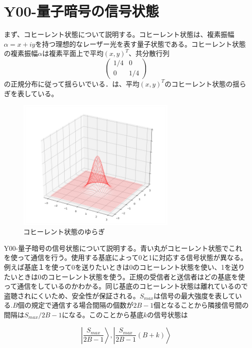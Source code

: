 \chapter{Y00-量子暗号の信号状態
}
まず、コヒーレント状態について説明する。コヒーレント状態は、複素振幅$\alpha=x+iy$を持つ理想的なレーザー光を表す量子状態である。コヒーレント状態の複素振幅$\alpha$は複素平面上で平均$(x,y)^T$、共分散行列 
$$
\begin{pmatrix}
1/4&0\\
0&1/4
\end{pmatrix}
$$
の正規分布に従って揺らいでいる．は、平均$(x,y)^T$のコヒーレント状態の揺らぎを表している。

\begin{figure}[htbp]
        \centering   
        \includegraphics[width=0.7\textwidth]{img/zemi1.png}
        \caption[sample image (png)]{コヒーレント状態のゆらぎ}
        \label{Fig:3_1}
    \end{figure}


Y00-量子暗号の信号状態について説明する。青い丸がコヒーレント状態でこれを使って通信を行う。使用する基底によって0と1に対応する信号状態が異なる。例えば基底１を使って0を送りたいときは0のコヒーレント状態を使い、1を送りたいときは0のコヒーレント状態を使う。正規の受信者と送信者はどの基底を使って通信をしているのかわかる。同じ基底のコヒーレント状態は離れているので盗聴されにくいため、安全性が保証される。$S_{max}$は信号の最大強度を表している.$B$個の規定で通信する場合間隔の個数が$2B-1$個となることから隣接信号間の間隔は$S_{max}/2B-1$になる。このことから基底$k$の信号状態は

$$
\left |\frac{S_{max}}{2B-1}\right\rangle,\left |\frac{S_{max}}{2B-1}(B+k)\right\rangle
$$

